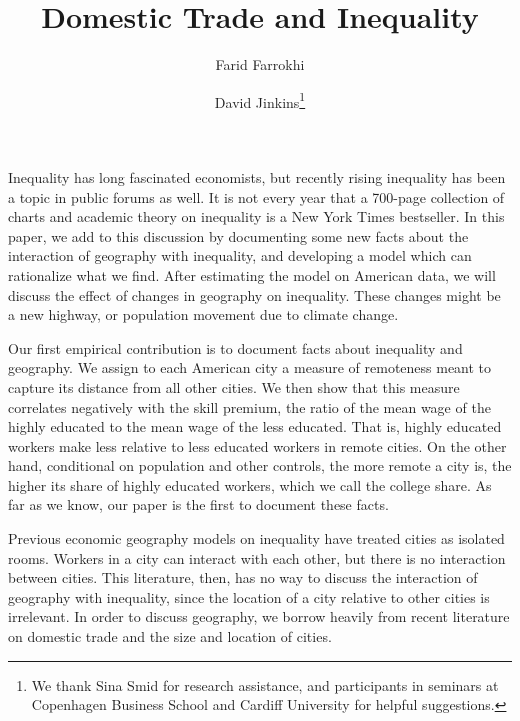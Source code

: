 \documentclass{article}
\title{Domestic Trade and Inequality}
\author[1]{Farid Farrokhi}
\author[2]{David Jinkins\thanks{We thank Sina Smid for research assistance, and participants in seminars at Copenhagen Business School and Cardiff University for helpful suggestions.}}
\affil[1]{Penn State}
\affil[2]{Copenhagen Business School}
\begin{document}
\maketitle

Inequality has long fascinated economists, but recently rising inequality has been a topic in public forums as well.  It is not every year that a 700-page collection of charts and academic theory on inequality is a New York Times bestseller.  In this paper, we add to this discussion by documenting some new facts about the interaction of geography with inequality, and developing a model which can rationalize what we find.  After estimating the model on American data, we will discuss the effect of changes in geography on inequality.  These changes might be a new highway, or population movement due to climate change.

Our first empirical contribution is to document facts about inequality and geography.  We assign to each American city a measure of remoteness meant to capture its distance from all other cities.  We then show that this measure correlates negatively with the skill premium, the ratio of the mean wage of the highly educated to the mean wage of the less educated.  That is, highly educated workers make less relative to less educated workers in remote cities.  On the other hand, conditional on population and other controls, the more remote a city is, the higher its share of highly educated workers, which we call the college share.  As far as we know, our paper is the first to document these facts.

Previous economic geography models on inequality have treated cities as isolated rooms.  Workers in a city can interact with each other, but there is no interaction between cities.  This literature, then, has no way to discuss the interaction of geography with inequality, since the location of a city relative to other cities is irrelevant.  In order to discuss geography, we borrow heavily from recent literature on domestic trade and the size and location of cities.

\end{document}
